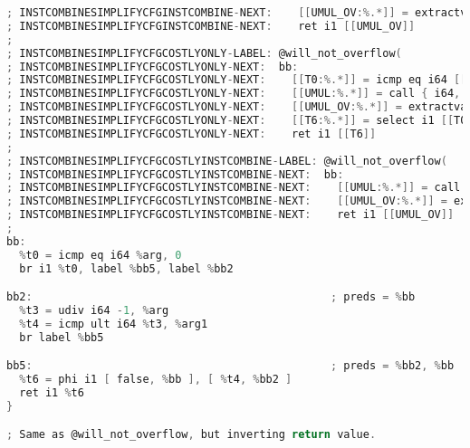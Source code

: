 \documentclass[a4paper]{article}
\theoremstyle{definition}
\begin{document}
\begin{lstlisting}[language=C]
; INSTCOMBINESIMPLIFYCFGINSTCOMBINE-NEXT:    [[UMUL_OV:%.*]] = extractvalue { i64, i1 } [[UMUL]], 1
; INSTCOMBINESIMPLIFYCFGINSTCOMBINE-NEXT:    ret i1 [[UMUL_OV]]
;
; INSTCOMBINESIMPLIFYCFGCOSTLYONLY-LABEL: @will_not_overflow(
; INSTCOMBINESIMPLIFYCFGCOSTLYONLY-NEXT:  bb:
; INSTCOMBINESIMPLIFYCFGCOSTLYONLY-NEXT:    [[T0:%.*]] = icmp eq i64 [[ARG:%.*]], 0
; INSTCOMBINESIMPLIFYCFGCOSTLYONLY-NEXT:    [[UMUL:%.*]] = call { i64, i1 } @llvm.umul.with.overflow.i64(i64 [[ARG]], i64 [[ARG1:%.*]])
; INSTCOMBINESIMPLIFYCFGCOSTLYONLY-NEXT:    [[UMUL_OV:%.*]] = extractvalue { i64, i1 } [[UMUL]], 1
; INSTCOMBINESIMPLIFYCFGCOSTLYONLY-NEXT:    [[T6:%.*]] = select i1 [[T0]], i1 false, i1 [[UMUL_OV]]
; INSTCOMBINESIMPLIFYCFGCOSTLYONLY-NEXT:    ret i1 [[T6]]
;
; INSTCOMBINESIMPLIFYCFGCOSTLYINSTCOMBINE-LABEL: @will_not_overflow(
; INSTCOMBINESIMPLIFYCFGCOSTLYINSTCOMBINE-NEXT:  bb:
; INSTCOMBINESIMPLIFYCFGCOSTLYINSTCOMBINE-NEXT:    [[UMUL:%.*]] = call { i64, i1 } @llvm.umul.with.overflow.i64(i64 [[ARG:%.*]], i64 [[ARG1:%.*]])
; INSTCOMBINESIMPLIFYCFGCOSTLYINSTCOMBINE-NEXT:    [[UMUL_OV:%.*]] = extractvalue { i64, i1 } [[UMUL]], 1
; INSTCOMBINESIMPLIFYCFGCOSTLYINSTCOMBINE-NEXT:    ret i1 [[UMUL_OV]]
;
bb:
  %t0 = icmp eq i64 %arg, 0
  br i1 %t0, label %bb5, label %bb2

bb2:                                              ; preds = %bb
  %t3 = udiv i64 -1, %arg
  %t4 = icmp ult i64 %t3, %arg1
  br label %bb5

bb5:                                              ; preds = %bb2, %bb
  %t6 = phi i1 [ false, %bb ], [ %t4, %bb2 ]
  ret i1 %t6
}

; Same as @will_not_overflow, but inverting return value.


\end{lstlisting}
\end{document}
